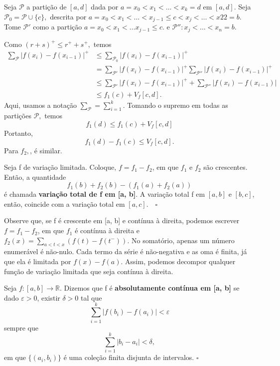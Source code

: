 \documentclass[MeasureTheory/measure_theory.tex]{subfiles}
\begin{document}
\begin{proof*}
	Seja \(\mathcal{P}\) a partição de \([a, d]\) dada por \(a = x_{0} < x_1 < \dotsc < x_{k} = d\) em \([a, d].\) Seja \(\mathcal{P}_{0} = \mathcal{P}\cup \{c\},\) descrita por
	\(a = x_{0} < x_1 < \dotsc < x_{j-1}\leq c < x_{j} < \dotsc <x22 = b.\) Tome \(\mathcal{P}'\) como a partição \(a = x_{0} < x_1 <\dotsc x_{j-1}\leq c\).
	e \(\mathcal{P}'': x_{j} < \dotsc < x_{n}=b\).

	Como \((r+s)^{+} \leq r^{+} + s^{+}, \) temos
	\begin{align*}
		\sum\limits_{\mathcal{P}}^{}|f(x_{i}) - f(x_{i-1})|^{+} & \leq \sum\limits_{\mathcal{P}_{0}}^{}|f(x_{i}) - f(x_{i-1})|^{+}                                                    \\
		                                                        & = \sum\limits_{\mathcal{P}'}^{}|f(x_{i}) - f(x_{i-1})|^{+}\sum\limits_{\mathcal{P}''}^{}|f(x_{i}) - f(x_{i-1})|^{+} \\
		                                                        & \leq \sum\limits_{\mathcal{P}'}^{}|f(x_{i})-f(x_{i-1})|^{+} + \sum\limits_{\mathcal{P}''}^{}|f(x_{i}) - f(x_{i-1})| \\
		                                                        & \leq f_1(c) + V_f[c, d].
	\end{align*}
	Aqui, usamos a notação \(\sum\limits_{\mathcal{P}}^{} = \sum\limits_{i=1}^{k}.\) Tomando o supremo em todas as partições \(\mathcal{P},\) temos
	\[
		f_1(d) \leq f_1(c) + V_f[c, d]
	\]
	Portanto,
	\[
		f_1(d) - f_1(c) \leq V_f[c, d].
	\]
	Para \(f_2,\), é similar. \qedsymbol
\end{proof*}
\begin{def*}
	Seja f de variação limitada. Coloque, \(f = f_1 - f_2\), em que \(f_1\) e \(f_2\) são crescentes. Então, a quantidade
	\[
		f_1(b) + f_2(b) - (f_1(a) + f_2(a))
	\]
	é chamada \textbf{variação total de f em [a, b]}. A variação total f em \([a, b]\) e \([b, c]\), então, coincide com a variação total em \([a, c]. \quad \square\)
\end{def*}
Observe que, se f é crescente em [a, b] e contínua à direita, podemos escrever \(f = f_1 - f_2\), em que \(f_1\) é contínua à direita e \(f_2(x) = \sum\limits_{a < t < x}^{}(f(t) - f(t^{-})).\) No somatório, apenas um número enumerável é não-nulo. Cada termo da série é não-negativa e as oma é finita, já que ela é limitada por \(f(x)-f(a).\) Assim, podemos
decompor qualquer função de variação limitada que seja contínua à direita.
\begin{def*}
	Seja \(f:[a, b]\rightarrow \mathbb{R}\). Dizemos que f é \textbf{absolutamente contínua em [a, b]} se dado \(\varepsilon  > 0\), existir \(\delta  > 0\) tal que
	\[
		\sum\limits_{i=1}^{k}|f(b_{i}) - f(a_{i})| < \varepsilon
	\]
	sempre que
	\[
		\sum\limits_{i=1}^{k}|b_{i} - a_{i}|  < \delta,
	\]
	em que \(\{(a_{i}, b_{i})\}\) é uma coleção finita disjunta de intervalos. \(\square\)
\end{def*}
\end{document}
